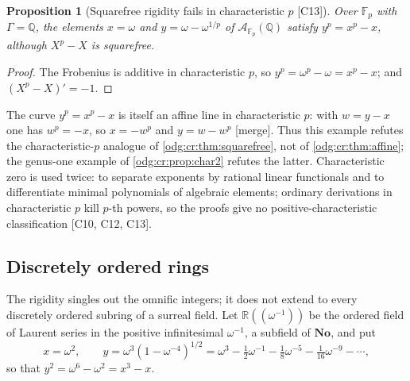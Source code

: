 \documentclass[11pt,oneside]{article}
\numberwithin{equation}{section}
\newtheorem{proposition}[proposition]{Proposition}
\theoremstyle{definition}
\theoremstyle{remark}
\newcommand{\No}{\mathbf{No}}
\newcommand{\Q}{\mathbb Q}
\newcommand{\R}{\mathbb R}
\newcommand{\src}[1]{\textup{\textsf{\small[#1]}}}
\newcommand{\mergetag}{\textup{\textsf{\small[merge]}}}
\begin{document}
\begin{proposition}[Squarefree rigidity fails in characteristic $p$ \src{C13}]\label{odg:cr:prop:charp}
Over $\mathbb F_p$ with $\Gamma=\Q$, the elements $x=\omega$ and
$y=\omega-\omega^{1/p}$ of $\mathcal A_{\mathbb F_p}(\Q)$ satisfy $y^p=x^p-x$, although
$X^p-X$ is squarefree.
\end{proposition}
\begin{proof}
The Frobenius is additive in characteristic $p$, so
$y^p=\omega^p-\omega=x^p-x$; and $(X^p-X)'=-1$.
\end{proof}

The curve $y^p=x^p-x$ is itself an affine line in characteristic $p$: with
$w=y-x$ one has $w^p=-x$, so $x=-w^p$ and $y=w-w^p$ \mergetag. Thus this example
refutes the characteristic-$p$ analogue of \cref{odg:cr:thm:squarefree}, not of
\cref{odg:cr:thm:affine}; the genus-one example of \cref{odg:cr:prop:char2} refutes
the latter. Characteristic zero is used twice: to separate exponents by rational
linear functionals and to differentiate minimal polynomials of algebraic elements;
ordinary derivations in characteristic $p$ kill $p$-th powers, so the proofs give no
positive-characteristic classification \src{C10, C12, C13}.

\subsection{Discretely ordered rings}\label{odg:cr:sub:dor}

The rigidity singles out the omnific integers; it does not extend to every
discretely ordered subring of a surreal field. Let $\R((\omega^{-1}))$ be the ordered
field of Laurent series in the positive infinitesimal $\omega^{-1}$, a subfield of
$\No$, and put
\[
 x=\omega^2,\qquad y=\omega^3(1-\omega^{-4})^{1/2}
 =\omega^3-\tfrac12\omega^{-1}-\tfrac18\omega^{-5}-\tfrac1{16}\omega^{-9}-\cdots,
\]
so that $y^2=\omega^6-\omega^2=x^3-x$.
\end{document}
